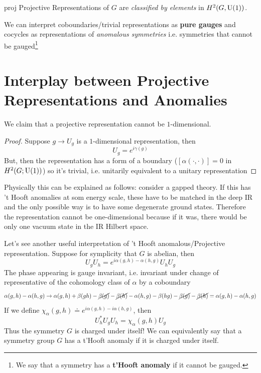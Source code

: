 \begin{thm}{}{proj}
    Projective Representations of $G$ are \textit{classified by elements} in $ H^2(G, \mathrm{U}(1))$.
\end{thm}
We can interpret coboundaries/trivial representations as \textbf{pure gauges} and cocycles as representations of \textit{anomalous symmetries} i.e. symmetries that cannot be gauged\footnote{We say that a symmetry has a \textbf{t'Hooft anomaly} if it cannot be gauged.}


\section{Interplay between Projective Representations and Anomalies}
We claim that a projective representation cannot be $1$-dimensional.
\begin{proof}
    Suppose $g \to U_g$ is a $1$-dimensional representation, then
\begin{equation}
        U_g = e^{i \gamma(g)}
\end{equation}
But, then the representation has a form of a boundary ($[\alpha(\cdot, \cdot)] = 0 $ in $H^2(G; \mathrm{U}(1))$) so it's trivial, i.e. unitarily equivalent to a unitary representation
\end{proof}
Physically this can be explained as follows: consider a gapped theory. If this has 't Hooft anomalies at som energy scale, these have to be matched in the deep IR and the only possible way is to have some degenerate ground states. Therefore the representation cannot be one-dimensional because if it was, there would be only one vacuum state in the IR Hilbert space.

Let's see another useful interpretation of 't Hooft anomalous/Projective representation. Suppose for symplicity that $G$ is abelian, then
\begin{equation}
    U_g U_h = e^{i \alpha(g,h) - \alpha(h,g)} U_h U_g
\end{equation}
The phase appearing is gauge invariant, i.e. invariant under change of representative of the cohomology class of $\alpha$ by a coboundary
\begin{equation}
    \alpha(g,h) - \alpha(h,g) \to \alpha(g,h) + \beta(gh) - \cancel{\beta(g)} -\cancel{\beta(h)} - \alpha(h,g) - \beta(hg) -\cancel{\beta(g)} -\cancel{\beta(h)} =  \alpha(g,h) - \alpha(h,g)
\end{equation}
If we define $\chi_{\alpha}(g,h) \doteq e^{i \alpha(g,h) - i\alpha(h,g)}$, then
\begin{equation}
     U_h^* U_g U_h = \chi_{\alpha}(g,h) U_g
\end{equation}
Thus the symmetry $G$ is charged under itself! We can equivalently say that a symmetry group $G$ has a t'Hooft anomaly if it is charged under itself.

